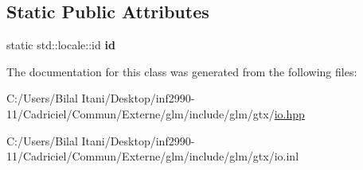 \subsection*{Static Public Attributes}
\begin{DoxyCompactItemize}
\item 
static std\+::locale\+::id {\bfseries id}\hypertarget{classglm_1_1io_1_1format__punct_a763f60aeaecec9290917ed1d83b79838}{}\label{classglm_1_1io_1_1format__punct_a763f60aeaecec9290917ed1d83b79838}

\end{DoxyCompactItemize}


The documentation for this class was generated from the following files\+:\begin{DoxyCompactItemize}
\item 
C\+:/\+Users/\+Bilal Itani/\+Desktop/inf2990-\/11/\+Cadriciel/\+Commun/\+Externe/glm/include/glm/gtx/\hyperlink{io_8hpp}{io.\+hpp}\item 
C\+:/\+Users/\+Bilal Itani/\+Desktop/inf2990-\/11/\+Cadriciel/\+Commun/\+Externe/glm/include/glm/gtx/io.\+inl\end{DoxyCompactItemize}

